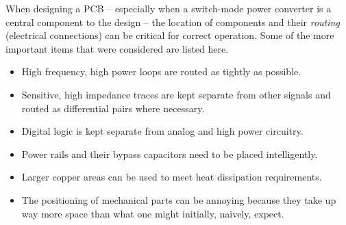 When designing a PCB --  especially  when  a  switch-mode  power  converter is a
central  component  to  the  design  --  the  location  of  components and their
\emph{routing} (electrical connections) can be  critical  for correct operation.
Some  of  the  more  important  items  that  were  considered  are  listed here.
\begin{itemize}
    \item
        High frequency, high power loops are routed as tightly as possible.
    \item
        Sensitive, high impedance traces are kept separate from other signals
        and routed as differential pairs where necessary.
    \item
        Digital logic is kept separate from analog and high power circuitry.
    \item
        Power rails and their bypass capacitors need to be placed intelligently.
    \item
        Larger copper areas can be used to meet heat dissipation requirements.
    \item
        The positioning of mechanical parts can be annoying because they take up
        way more space than what one might initially, naively, expect.
\end{itemize}

